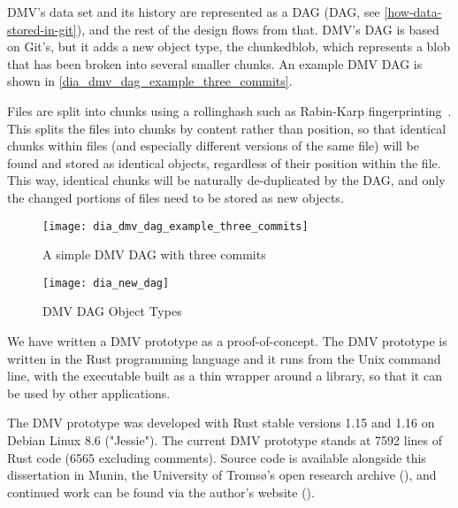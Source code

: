 \gls{DMV}'s data set and its history are represented as a \acrshort{DAG} (\acrlong{DAG}, see \autoref{how-data-stored-in-git}), and the rest of the design flows from that.
\gls{DMV}'s \gls{DAG} is based on Git's, but it adds a new object type, the \gls{chunkedblob}, which represents a \gls{blob} that has been broken into several smaller chunks.
An example \gls{DMV} \gls{DAG} is shown in \autoref{dia_dmv_dag_example_three_commits}.


Files are split into chunks using a \gls{rollinghash} such as Rabin-Karp fingerprinting~\cite{rabin_karp_fingerprinting}.
This splits the files into chunks by content rather than position, so that identical chunks within files (and especially different versions of the same file) will be found and stored as identical objects, regardless of their position within the file.
This way, identical chunks will be naturally de-duplicated by the \gls{DAG}, and only the changed portions of files need to be stored as new objects.


\begin{figure}[]
    \centering

    \begin{minipage}{.65\textwidth}
        \texttt{[image: dia\_dmv\_dag\_example\_three\_commits]}
        \caption{A simple DMV DAG with three commits}
        \label{dia_dmv_dag_example_three_commits}
    \end{minipage}%
    \begin{minipage}{.35\textwidth}
        \texttt{[image: dia\_new\_dag]}
        \caption{DMV DAG Object Types}
        \label{fig:dia_new_dag}
    \end{minipage}
\end{figure}


We have written a \gls{DMV} prototype as a proof-of-concept. The \gls{DMV}
prototype is written in the Rust programming language and it runs from the Unix
command line, with the executable built as a thin wrapper around a library, so
that it can be used by other applications.

The \gls{DMV} prototype was developed with Rust stable versions 1.15 and 1.16 on
Debian Linux 8.6 ("Jessie"). The current DMV prototype stands at \num{7592}
lines of Rust code (\num{6565} excluding comments). Source code is available
alongside this dissertation in Munin, the University of Tromsø's open research
archive (\muninurl), and continued work can be found via the author's website
(\dmvurl).

